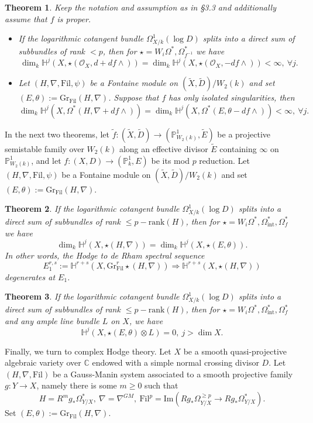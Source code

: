 \documentclass[12pt, a4paper]{article}
\newtheorem{theorem}{Theorem}[section]
\begin{document}
\begin{theorem}
Keep the notation and assumption as in \S3.3 and additionally assume that $f$ is proper.
\begin{itemize}
\item[$\mathrm{(i)}$\ ] If the logarithmic cotangent bundle $\Omega^1_{X/k}(\log D)$ splits into a direct sum of subbundles of rank $<p$, then for $\star=W_i\Omega^*,\Omega^*_{f^{-1}}$ we have
$$
\dim_k\mathbb H^j(X,\star(\mathcal O_X,d+df\wedge))=\dim_k\mathbb H^j(X,\star(\mathcal O_X,-df\wedge))<\infty,~\forall j.
$$

\item[$\mathrm{(ii)}$\ ] Let $(H,\nabla,\mathrm{Fil},\psi)$ be a Fontaine module on $(\tilde X,\tilde D)/W_2(k)$ and set $(E,\theta):=\mathrm{Gr}_\mathrm{Fil}(H,\nabla)$. Suppose that $f$ has only isolated singularities, then
$$
\dim_k\mathbb H^j(X,\Omega^*(H,\nabla+df\wedge))=\dim_k\mathbb H^j(X,\Omega^*(E,\theta-df\wedge))<\infty,~\forall j.
$$
\end{itemize}
\end{theorem}
In the next two theorems, let $\tilde f:(\tilde X,\tilde D)\to(\mathbb P^1_{W_2(k)},\tilde E)$ be a projective semistable family over $W_2(k)$ along an effective divisor $\tilde E$ containing $\infty$ on $\mathbb P^1_{W_2(k)}$, and let $f:(X,D)\to(\mathbb P^1_k,E)$ be its mod $p$ reduction. Let $(H,\nabla,\mathrm{Fil},\psi)$ be a Fontaine module on $(\tilde X,\tilde D)/W_2(k)$ and set $(E,\theta):=\mathrm{Gr}_\mathrm{Fil}(H,\nabla)$.
\begin{theorem}
    If the logarithmic cotangent bundle $\Omega^1_{X/k}(\log D)$ splits into a direct sum of subbundles of rank $\leq p-\mathrm{rank}(H)$, then for $\star=W_i\Omega^*,\Omega^*_\mathrm{int},\Omega^*_f$ we have
$$
\dim_k\mathbb H^j(X,\star(H,\nabla))=\dim_k\mathbb H^j(X,\star(E,\theta)).
$$
In other words, the Hodge to de Rham spectral sequence 
$$
E_1^{r,s}:=\mathbb H^{r+s}(X,\mathrm{Gr}_\mathrm{Fil}^r\star(H,\nabla))\Rightarrow\mathbb H^{r+s}(X,\star(H,\nabla))
$$
degenerates at $E_1$.
\end{theorem} 
\begin{theorem}
If the logarithmic cotangent bundle $\Omega^1_{X/k}(\log D)$ splits into a direct sum of subbundles of rank $\leq p-\mathrm{rank}(H)$, then for $\star=W_i\Omega^*,\Omega^*_\mathrm{int},\Omega^*_f$  and any ample line bundle $L$ on $X$, we have
$$
\mathbb H^j(X,\star(E,\theta)\otimes L)=0,~j>\dim X.
$$
\end{theorem}

Finally, we turn to complex Hodge theory. Let $X$ be a smooth quasi-projective algebraic variety over $\mathbb C$ endowed with a simple normal crossing divisor $D$. Let $(H,\nabla,\mathrm{Fil})$ be a Gauss-Manin system associated to a smooth projective family $g:Y\to X$, namely there is some $m\geq0$ such that
$$
H=R^mg_*\Omega^*_{Y/X},~\nabla=\nabla^{GM},~\mathrm{Fil}^p=\mathrm{Im}(Rg_*\Omega_{Y/X}^{\geq p}\to Rg_*\Omega_{Y/X}^*).
$$
Set $(E,\theta):=\mathrm{Gr}_\mathrm{Fil}(H,\nabla)$.
\end{document}
